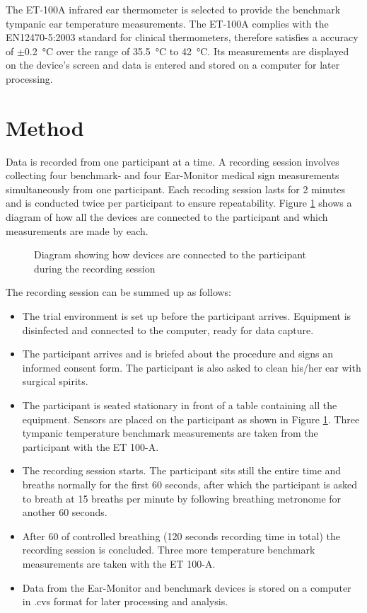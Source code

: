 \medskip

The ET-100A infrared ear thermometer is selected to provide the benchmark tympanic ear temperature measurements. The ET-100A complies with the EN12470-5:2003 standard for clinical thermometers, therefore satisfies a accuracy of $\pm$\SI{0.2}{\celsius} over the range of \SI{35.5}{\celsius} to \SI{42}{\celsius}. Its measurements are displayed on the device's screen and data is entered and stored on a computer for later processing.


\section{Method}
Data is recorded from one participant at a time. A recording session involves collecting four benchmark- and four Ear-Monitor medical sign measurements simultaneously from one participant. Each recoding session lasts for 2 minutes and is conducted twice per participant to ensure repeatability. Figure \ref{fig:SetUp} shows a diagram of how all the devices are connected to the participant and which measurements are made by each.

\begin{figure}[H]
\centering
\graphicspath{{figs/}}

\caption{Diagram showing how devices are connected to the participant during the recording session}
\label{fig:SetUp}
\end{figure}

The recording session can be summed up as follows:

\begin{itemize}
\item The trial environment is set up before the participant arrives. Equipment is disinfected and connected to the computer, ready for data capture. 
\item The participant arrives and is briefed about the procedure and signs an informed consent form. The participant is also asked to clean his/her ear with surgical spirits.
\item The participant is seated stationary in front of a table containing all the equipment. Sensors are placed on the participant as shown in Figure \ref{fig:SetUp}. Three tympanic temperature benchmark measurements are taken from the participant with the ET 100-A.
\item The recording session starts. The participant sits still the entire time and breaths normally for the first 60 seconds, after which the participant is asked to breath at 15 breaths per minute by following breathing metronome for another 60 seconds.
\item After 60 of controlled breathing (120 seconds recording time in total) the recording session is concluded. Three more temperature benchmark measurements are taken with the ET 100-A.
\item Data from the Ear-Monitor and benchmark devices is stored on a computer in .cvs format for later processing and analysis.
\end{itemize}

